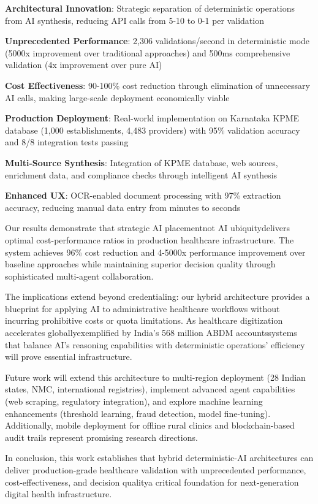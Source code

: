 \documentclass[conference]{IEEEtran}
\begin{document}
\textbf{Architectural Innovation}: Strategic separation of deterministic operations from AI synthesis, reducing API calls from 5-10 to 0-1 per validation

\textbf{Unprecedented Performance}: 2,306 validations/second in deterministic mode (5000x improvement over traditional approaches) and 500ms comprehensive validation (4x improvement over pure AI)

\textbf{Cost Effectiveness}: 90-100\% cost reduction through elimination of unnecessary AI calls, making large-scale deployment economically viable

\textbf{Production Deployment}: Real-world implementation on Karnataka KPME database (1,000 establishments, 4,483 providers) with 95\% validation accuracy and 8/8 integration tests passing

\textbf{Multi-Source Synthesis}: Integration of KPME database, web sources, enrichment data, and compliance checks through intelligent AI synthesis

\textbf{Enhanced UX}: OCR-enabled document processing with 97\% extraction accuracy, reducing manual data entry from minutes to seconds

Our results demonstrate that strategic AI placementnot AI ubiquitydelivers optimal cost-performance ratios in production healthcare infrastructure. The system achieves 96\% cost reduction and 4-5000x performance improvement over baseline approaches while maintaining superior decision quality through sophisticated multi-agent collaboration.

The implications extend beyond credentialing: our hybrid architecture provides a blueprint for applying AI to administrative healthcare workflows without incurring prohibitive costs or quota limitations. As healthcare digitization accelerates globallyexemplified by India's 568 million ABDM accountssystems that balance AI's reasoning capabilities with deterministic operations' efficiency will prove essential infrastructure.

Future work will extend this architecture to multi-region deployment (28 Indian states, NMC, international registries), implement advanced agent capabilities (web scraping, regulatory integration), and explore machine learning enhancements (threshold learning, fraud detection, model fine-tuning). Additionally, mobile deployment for offline rural clinics and blockchain-based audit trails represent promising research directions.

In conclusion, this work establishes that hybrid deterministic-AI architectures can deliver production-grade healthcare validation with unprecedented performance, cost-effectiveness, and decision qualitya critical foundation for next-generation digital health infrastructure.
\end{document}
